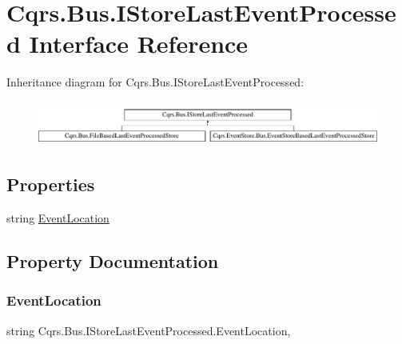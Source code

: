 \hypertarget{interfaceCqrs_1_1Bus_1_1IStoreLastEventProcessed}{}\section{Cqrs.\+Bus.\+I\+Store\+Last\+Event\+Processed Interface Reference}
\label{interfaceCqrs_1_1Bus_1_1IStoreLastEventProcessed}
Inheritance diagram for Cqrs.\+Bus.\+I\+Store\+Last\+Event\+Processed\+:\begin{figure}[H]
\begin{center}
\leavevmode
\includegraphics[height=1.462141cm]{interfaceCqrs_1_1Bus_1_1IStoreLastEventProcessed}
\end{center}
\end{figure}
\subsection*{Properties}
\begin{DoxyCompactItemize}
\item 
string \hyperlink{interfaceCqrs_1_1Bus_1_1IStoreLastEventProcessed_a4273c4f0bd5703d5eec2c0625436ed69}{Event\+Location}
\end{DoxyCompactItemize}


\subsection{Property Documentation}
\mbox{\label{interfaceCqrs_1_1Bus_1_1IStoreLastEventProcessed_a4273c4f0bd5703d5eec2c0625436ed69}} 
\subsubsection{\texorpdfstring{Event\+Location}{EventLocation}}
{\footnotesize\ttfamily string Cqrs.\+Bus.\+I\+Store\+Last\+Event\+Processed.\+Event\+Location\hspace{0.3cm}{\ttfamily [get]}, {\ttfamily [set]}}


